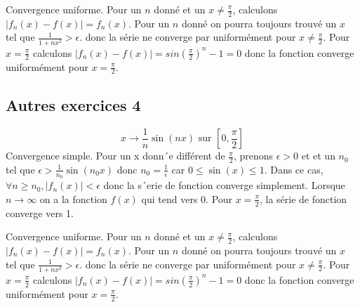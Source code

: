 \documentclass[]{book}
\theoremstyle{definition}
\begin{document}
Convergence uniforme. Pour un $n$ donn\'e et un $x \neq \frac{\pi}{2}$, calculons $|f_n(x) - f(x)| = f_n(x)$. Pour un $n$ donn\'e on pourra toujours trouv\'e un $x$ tel que $\frac{1}{1+nx^2} > \epsilon$. donc la s\'erie ne converge par uniform\'ement pour $x \neq \frac{\pi}{2}$. Pour $x=\frac{\pi}{2}$ calculons $|f_n(x) - f(x)| = sin(\frac{\pi}{2})^{n} -1 = 0$ donc la fonction converge uniform\'ement pour $x=\frac{\pi}{2}$.


\subsection*{Autres exercices 4}
$$x \to \frac{1}{n}\sin(nx) \text{ sur } [0,\frac{\pi}{2}]$$
Convergence simple. Pour un x donn´e diff\'erent de $\frac{\pi}{2}$, prenons $\epsilon> $0 et et un $n_0$ tel que $\epsilon > \frac{1}{n_0}\sin(n_0x)$ donc $n_0 = \frac{1}{\epsilon}$ car $0 \leq \sin(x) \leq 1$. Dans ce cas, $\forall n \geq n_0, |f_n(x)| < \epsilon$ donc la s´erie de fonction converge simplement. Lorsque $n \to \infty$ on a la fonction $f(x)$ qui tend vers 0. Pour $x=\frac{\pi}{2}$, la s\'erie de fonction converge vers 1.

Convergence uniforme. Pour un $n$ donn\'e et un $x \neq \frac{\pi}{2}$, calculons $|f_n(x) - f(x)| = f_n(x)$. Pour un $n$ donn\'e on pourra toujours trouv\'e un $x$ tel que $\frac{1}{1+nx^2} > \epsilon$. donc la s\'erie ne converge par uniform\'ement pour $x \neq \frac{\pi}{2}$. Pour $x=\frac{\pi}{2}$ calculons $|f_n(x) - f(x)| = sin(\frac{\pi}{2})^{n} -1 = 0$ donc la fonction converge uniform\'ement pour $x=\frac{\pi}{2}$.
\end{document}
